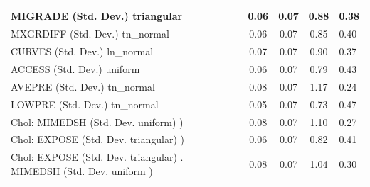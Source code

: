\begin{table}
\begin{center}
\begin{tabular}{|l|l|c|c|c|l|}
			\hline
			MIGRADE (Std. Dev.) triangular &  & 0.06 & 0.07 & 0.88 & 0.38 \\
			\hline
			MXGRDIFF (Std. Dev.) tn_normal &  & 0.06 & 0.07 & 0.85 & 0.40 \\
			\hline
			CURVES (Std. Dev.) ln_normal &  & 0.07 & 0.07 & 0.90 & 0.37 \\
			\hline
			ACCESS (Std. Dev.) uniform &  & 0.06 & 0.07 & 0.79 & 0.43 \\
			\hline
			AVEPRE (Std. Dev.) tn_normal &  & 0.08 & 0.07 & 1.17 & 0.24 \\
			\hline
			LOWPRE (Std. Dev.) tn_normal &  & 0.05 & 0.07 & 0.73 & 0.47 \\
			\hline
			 Chol: MIMEDSH (Std. Dev. uniform) ) &  & 0.08 & 0.07 & 1.10 & 0.27 \\
			\hline
			 Chol: EXPOSE (Std. Dev. triangular) ) &  & 0.06 & 0.07 & 0.82 & 0.41 \\
			\hline
			 Chol: EXPOSE (Std. Dev. triangular) . MIMEDSH (Std. Dev.   uniform ) &  & 0.08 & 0.07 & 1.04 & 0.30 \\
			\hline
		\end{tabular}
	\end{center}
\end{table}